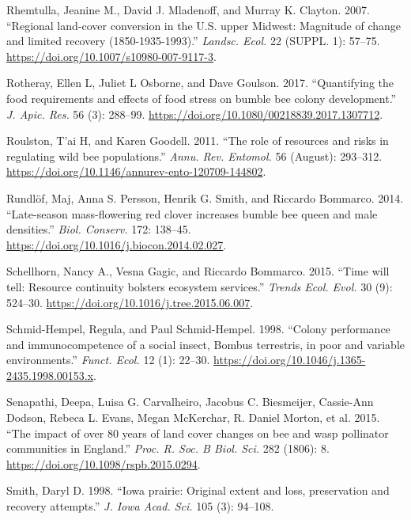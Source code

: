 \documentclass[11pt,]{article}
\begin{document}
\leavevmode\hypertarget{ref-Rhemtulla2007}{}%
Rhemtulla, Jeanine M., David J. Mladenoff, and Murray K. Clayton. 2007.
``Regional land-cover conversion in the U.S. upper Midwest: Magnitude of
change and limited recovery (1850-1935-1993).'' \emph{Landsc. Ecol.} 22
(SUPPL. 1): 57--75. \url{https://doi.org/10.1007/s10980-007-9117-3}.

\leavevmode\hypertarget{ref-Rotheray2017}{}%
Rotheray, Ellen L, Juliet L Osborne, and Dave Goulson. 2017.
``Quantifying the food requirements and effects of food stress on bumble
bee colony development.'' \emph{J. Apic. Res.} 56 (3): 288--99.
\url{https://doi.org/10.1080/00218839.2017.1307712}.

\leavevmode\hypertarget{ref-Roulston2011}{}%
Roulston, T'ai H, and Karen Goodell. 2011. ``The role of resources and
risks in regulating wild bee populations.'' \emph{Annu. Rev. Entomol.}
56 (August): 293--312.
\url{https://doi.org/10.1146/annurev-ento-120709-144802}.

\leavevmode\hypertarget{ref-Rundlof2014}{}%
Rundlöf, Maj, Anna S. Persson, Henrik G. Smith, and Riccardo Bommarco.
2014. ``Late-season mass-flowering red clover increases bumble bee queen
and male densities.'' \emph{Biol. Conserv.} 172: 138--45.
\url{https://doi.org/10.1016/j.biocon.2014.02.027}.

\leavevmode\hypertarget{ref-Schellhorn2015c}{}%
Schellhorn, Nancy A., Vesna Gagic, and Riccardo Bommarco. 2015. ``Time
will tell: Resource continuity bolsters ecosystem services.''
\emph{Trends Ecol. Evol.} 30 (9): 524--30.
\url{https://doi.org/10.1016/j.tree.2015.06.007}.

\leavevmode\hypertarget{ref-Schmid-Hempel1998a}{}%
Schmid-Hempel, Regula, and Paul Schmid-Hempel. 1998. ``Colony
performance and immunocompetence of a social insect, Bombus terrestris,
in poor and variable environments.'' \emph{Funct. Ecol.} 12 (1): 22--30.
\url{https://doi.org/10.1046/j.1365-2435.1998.00153.x}.

\leavevmode\hypertarget{ref-Senapathi2015a}{}%
Senapathi, Deepa, Luisa G. Carvalheiro, Jacobus C. Biesmeijer,
Cassie-Ann Dodson, Rebeca L. Evans, Megan McKerchar, R. Daniel Morton,
et al. 2015. ``The impact of over 80 years of land cover changes on bee
and wasp pollinator communities in England.'' \emph{Proc. R. Soc. B
Biol. Sci.} 282 (1806): 8. \url{https://doi.org/10.1098/rspb.2015.0294}.

\leavevmode\hypertarget{ref-Smith1998}{}%
Smith, Daryl D. 1998. ``Iowa prairie: Original extent and loss,
preservation and recovery attempts.'' \emph{J. Iowa Acad. Sci.} 105 (3):
94--108.
\end{document}
